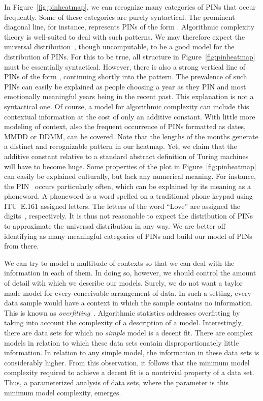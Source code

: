 \begin{example}
  In Figure~\ref{fig:pinheatmap}, we can recognize many categories of PINs that occur frequently.
  Some of these categories are purely syntactical.
  The prominent diagonal line, for instance, represents PINs of the form .
  Algorithmic complexity theory is well-suited to deal with such patterns.
  We may therefore expect the universal distribution~\parencite{li2008introduction}, though uncomputable, to be a good model for the distribution of PINs.
  For this to be true, all structure in Figure~\ref{fig:pinheatmap} must be essentially syntactical.
  However, there is also a strong vertical line of PINs of the form , continuing shortly into the  pattern.
  The prevalence of such PINs can easily be explained as people choosing a year as they PIN and most emotionally meaningful years being in the recent past.
  This explanation is not a syntactical one.
  Of course, a model for algorithmic complexity can include this contextual information at the cost of only an additive constant.
  With little more modeling of context, also the frequent occurrence of PINs formatted as dates, MMDD or DDMM, can be covered.
  Note that the lengths of the months generate a distinct and recognizable pattern in our heatmap.
  Yet, we claim that the additive constant relative to a standard abstract definition of Turing machines will have to become huge.
  Some properties of the plot in Figure~\ref{fig:pinheatmap} can easily be explained culturally, but lack any numerical meaning.
  For instance, the PIN~ occurs particularly often, which can be explained by its meaning as a phoneword.
  A phoneword is a word spelled on a traditional phone keypad using ITU~E.161 assigned letters.
  The letters of the word \enquote{Love} are assigned the digits~, respectively.
  It is thus not reasonable to expect the distribution of PINs to approximate the universal distribution in any way.
  We are better off identifying as many meaningful categories of PINs and build our model of PINs from there.
\end{example}

We can try to model a multitude of contexts so that we can deal with the information in each of them.
In doing so, however, we should control the amount of detail with which we describe our models.
Surely, we do not want a taylor made model for every conceivable arrangement of data.
In such a setting, every data sample would have a context in which the sample contains no information.
This is known as \emph{overfitting}~\parencite{grunwald2007minimum}.
Algorithmic statistics addresses overfitting by taking into account the complexity of a description of a model.
Interestingly, there are data sets for which no \emph{simple} model is a decent fit.
There are complex models in relation to which these data sets contain disproportionately little information.
In relation to any simple model, the information in these data sets is considerably higher.
From this observation, it follows that the minimum model complexity required to achieve a decent fit is a nontrivial property of a data set.
Thus, a parameterized analysis of data sets, where the parameter is this minimum model complexity, emerges.

